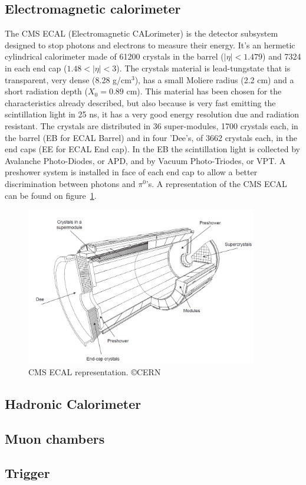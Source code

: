 \subsection{Electromagnetic calorimeter}
\label{sec:ecal}

The CMS ECAL (Electromagnetic CALorimeter) is the detector subsystem designed to stop photons and electrons to measure their energy. It's an hermetic cylindrical calorimeter made of 61200 crystals in the barrel ($|\eta|<1.479$) and 7324 in each end cap ($1.48<|\eta|<3$). The crystals material is lead-tungstate that is transparent, very dense (8.28 g/$\text{cm}^{3}$), has a small Moliere radius (2.2 cm) and a short radiation depth ($X_{0}=0.89$ cm). This material has been chosen for the characteristics already described, but also because is very fast emitting the scintillation light in 25 ns, it has a very good energy resolution due and radiation resistant. The crystals are distributed in 36 super-modules, 1700 crystals each, in the barrel (EB for ECAL Barrel) and in four 'Dee's, of 3662 crystals each, in the end caps (EE for ECAL End cap). In the EB the scintillation light is collected by Avalanche Photo-Diodes, or APD, and by Vacuum Photo-Triodes, or VPT. A preshower system is installed in face of each end cap to allow a better discrimination between photons and $\pi^{0}$'s. A representation of the CMS ECAL can be found on figure~\ref{fig:ecal}.

\begin{figure}[!Hhtbp]
  \begin{center}
    \includegraphics[width=0.9\textwidth]{figs/ECAL.png}
    \caption{CMS ECAL representation. \copyright CERN}
    \label{fig:ecal}
  \end{center}
\end{figure}

\subsection{Hadronic Calorimeter}
\label{sec:hcal}

\subsection{Muon chambers}
\label{sec:muons}

\subsection{Trigger}
\label{sec:trigger}



